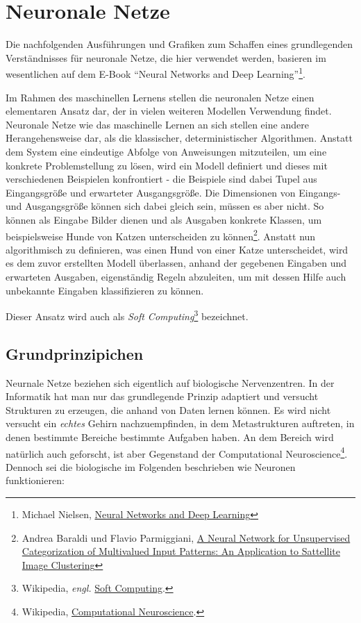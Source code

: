 \section{Neuronale Netze}

Die nachfolgenden Ausführungen und Grafiken zum Schaffen eines grundlegenden Verständnisses für neuronale Netze, die hier verwendet werden, basieren im wesentlichen auf dem E-Book ``Neural Networks and Deep Learning''\footnote{Michael Nielsen, \href{http://neuralnetworksanddeeplearning.com/index.html}{Neural Networks and Deep Learning}}.

Im Rahmen des maschinellen Lernens stellen die neuronalen Netze einen elementaren Ansatz dar, der in vielen weiteren Modellen Verwendung findet. Neuronale Netze wie das maschinelle Lernen an sich stellen eine andere Herangehensweise dar, als die klassischer, deterministischer Algorithmen. Anstatt dem System eine eindeutige Abfolge von Anweisungen mitzuteilen, um eine konkrete Problemstellung zu lösen, wird ein Modell definiert und dieses mit verschiedenen Beispielen konfrontiert - die Beispiele sind dabei Tupel aus Eingangsgröße und erwarteter Ausgangsgröße. Die Dimensionen von Eingangs- und Ausgangsgröße können sich dabei gleich sein, müssen es aber nicht. So können als Eingabe Bilder dienen und als Ausgaben konkrete Klassen, um beispielsweise Hunde von Katzen unterscheiden zu können\footnote{Andrea Baraldi und Flavio Parmiggiani, \href{http://ba1.geog.umd.edu/PapersBaraldi/TGARS95\_2\_[5].pdf}{A Neural Network for Unsupervised Categorization of Multivalued Input Patterns: An Application to Sattellite Image Clustering}}.
Anstatt nun algorithmisch zu definieren, was einen Hund von einer Katze unterscheidet, wird es dem zuvor erstellten Modell überlassen, anhand der gegebenen Eingaben und erwarteten Ausgaben, eigenständig Regeln abzuleiten, um mit dessen Hilfe auch unbekannte Eingaben klassifizieren zu können.

Dieser Ansatz wird auch als \textit{Soft Computing}\footnote{Wikipedia, \textit{engl.} \href{https://en.wikipedia.com/wiki/Soft\_Computing}{Soft Computing}.} bezeichnet.

\subsection{Grundprinzipichen}

Neurnale Netze beziehen sich eigentlich auf biologische Nervenzentren. In der Informatik hat man nur das grundlegende Prinzip adaptiert und versucht Strukturen zu erzeugen, die anhand von Daten lernen können. Es wird nicht versucht ein \textit{echtes} Gehirn nachzuempfinden, in dem Metastrukturen auftreten, in denen bestimmte Bereiche bestimmte Aufgaben haben. An dem Bereich wird natürlich auch geforscht, ist aber Gegenstand der Computational Neuroscience\footnote{Wikipedia, \href{https://de.wikipedia.org/wiki/Computational\_Neuroscience}{Computational Neuroscience}.}.
Dennoch sei die biologische im Folgenden beschrieben wie Neuronen funktionieren:

